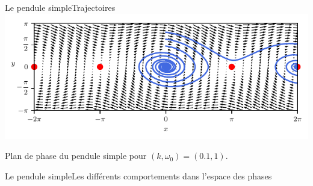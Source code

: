\documentclass[usenames,dvipsnames,svgnames,10pt,aspectratio=169]{beamer}
\begin{document}
\begin{frame}[t, c]{Le pendule simple}{Trajectoires}
	\centering
	\includegraphics[width=.75\textwidth]{pendulum_fixed_trajectories_bis}

	Plan de phase du pendule simple pour $(k, \omega_0) = (0.1, 1)$.
	\vspace{1cm}
\end{frame}

\begin{frame}[t, c]{Le pendule simple}{Les différents comportements dans l'espace des phases}


\end{frame}
\end{document}

